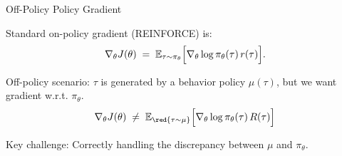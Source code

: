\documentclass[usenames,dvipsnames,notes,11pt,aspectratio=169,hyperref={colorlinks=true, linkcolor=blue}]{beamer}
\begin{document}
\begin{frame}{Off-Policy Policy Gradient}
  \begin{wideitemize}
    \item Standard on-policy gradient (REINFORCE) is:
    \[
      \nabla_\theta J(\theta)
      \;=\;
      \mathbb{E}_{\tau \sim \pi_\theta}\Bigl[
        \nabla_\theta \log \pi_\theta(\tau)\, r(\tau)
      \Bigr].
    \]
    \item Off-policy scenario: $\tau$ is generated by a behavior policy $\mu(\tau)$, but we want gradient w.r.t. $\pi_\theta$.
    \[
      \nabla_\theta J(\theta)
      \;\neq\;
          \mathbb{E}_{\red{\tau \sim \mu}}\Bigl[
        \nabla_\theta \log \pi_\theta(\tau)
        \,R(\tau)
      \Bigr]
    \]
    \item Key challenge: Correctly handling the discrepancy between $\mu$ and $\pi_\theta$.
  \end{wideitemize}
\end{frame}
\end{document}
